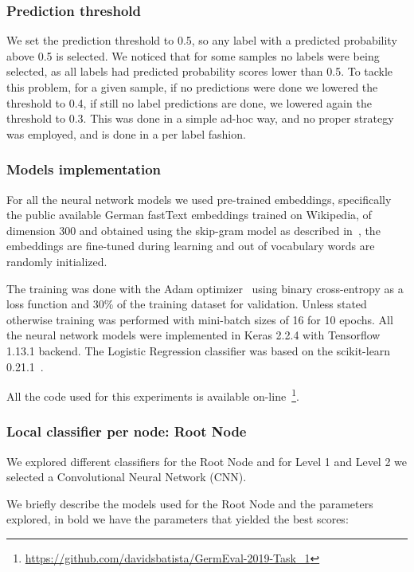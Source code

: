 \documentclass[11pt,a4paper]{article}
\begin{document}
\subsubsection{Prediction threshold}\label{threshold}

We set the prediction threshold to 0.5, so any label with a predicted probability
above 0.5 is selected. We noticed that for some samples no labels were
being selected, as all labels had predicted probability scores lower than 0.5.
To tackle this problem, for a given sample, if no predictions were done we lowered
the threshold to 0.4, if still no label predictions are done, we lowered again
the threshold to 0.3. This was done in a simple ad-hoc way, and no proper strategy
was employed, and is done in a per label fashion.


\subsubsection{Models implementation}

For all the neural network models we used pre-trained embeddings, specifically
the public available German fastText embeddings trained on Wikipedia, of
dimension 300 and obtained using the skip-gram model as described
in~\citet{bojanowski-etal-2017-enriching}, the embeddings are fine-tuned
during learning and out of vocabulary words are randomly initialized.

The training was done with the Adam optimizer~\cite{journals/corr/KingmaB14}
using binary cross-entropy as a loss function and 30\% of the training
dataset for validation. Unless stated otherwise training was performed with
mini-batch sizes of 16 for 10 epochs. All the neural network models were
implemented in Keras 2.2.4 with Tensorflow 1.13.1 backend. The Logistic
Regression classifier was based on the scikit-learn
0.21.1~\cite{Pedregosa:2011:SML:1953048.2078195}.

All the code used for this experiments is available
on-line~\footnote{\url{https://github.com/davidsbatista/GermEval-2019-Task_1}}.


\subsubsection{Local classifier per node: Root Node}

We explored different classifiers for the Root Node and for Level 1 and Level 2
we selected a Convolutional Neural Network (CNN).

We briefly describe the models used for the Root Node and the parameters explored,
in bold we have the parameters that yielded the best scores:
\end{document}
